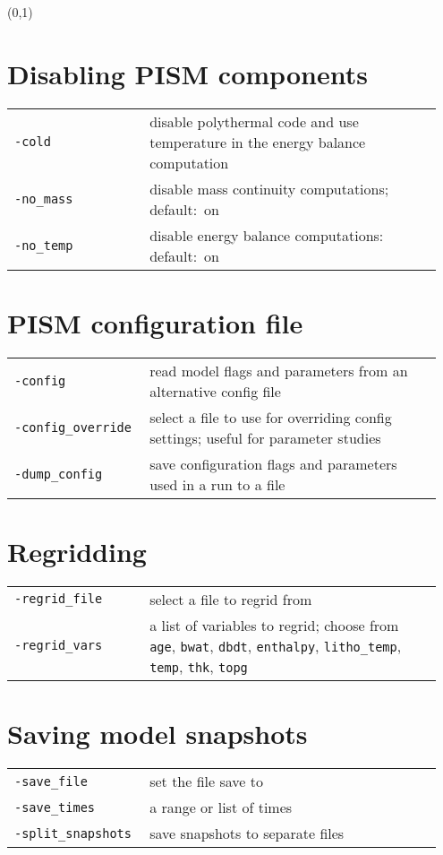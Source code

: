 \documentclass[landscape]{article}
\begin{document}
\begin{textblock}{15}(0,1)

\section{Disabling PISM components}
\label{sec:switches}
\begin{tabular}{@{}p{0.3\linewidth}p{0.65\linewidth}@{}}
\texttt{-cold} & disable polythermal code and use temperature in the energy
balance computation\\
\texttt{-no_mass} & disable mass continuity computations; \mbox{default: on}\\
\texttt{-no_temp} & disable energy balance computations: \mbox{default: on}
\end{tabular}

\section{PISM configuration file}
\label{sec:pism-config-file}
\begin{tabular}{@{}p{0.3\linewidth}p{0.65\linewidth}@{}}
\texttt{-config} & read model flags and parameters from an alternative config file\\
\texttt{-config_override} & select a file to use for overriding config
settings; useful for parameter studies\\
\texttt{-dump_config} & save configuration flags and parameters used in a run to a file
\end{tabular}

\section{Regridding}
\label{sec:regridding}
\begin{tabular}{@{}p{0.3\linewidth}p{0.65\linewidth}@{}}
  \texttt{-regrid_file} & select a file to regrid from\\
  \texttt{-regrid_vars} & a list of variables to regrid; choose from
  \texttt{age}, \texttt{bwat}, \texttt{dbdt}, \texttt{enthalpy}, \texttt{litho_temp}, \texttt{temp},
  \texttt{thk}, \texttt{topg}\\
\end{tabular}

\section{Saving model snapshots}
\label{sec:snapshots}
\begin{tabular}{@{}p{0.3\linewidth}p{0.65\linewidth}@{}}
\texttt{-save_file} & set the file save to\\
\texttt{-save_times} & a range or list of times\\
\texttt{-split_snapshots} & save snapshots to separate files\\
\end{tabular}


\end{textblock}
\end{document}
